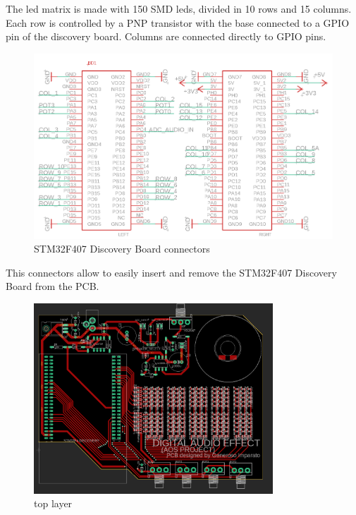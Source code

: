     The led matrix is made with 150 SMD leds, divided in 10 rows and 15 columns.\\
    Each row is controlled by a PNP transistor with the base connected to a GPIO pin of the discovery board. Columns are connected directly to GPIO pins.
    
    \begin{figure}[H]
      \centering
        \includegraphics[width=\textwidth]{img/stm32.png}
        \caption{STM32F407 Discovery Board connectors}
    \end{figure}
    
    This connectors allow to easily insert and remove the STM32F407 Discovery Board from the PCB.

\newpage
{}
\label{sec:Layout}
    
    \begin{figure}[H]
      \centering
        \includegraphics[width=0.8\textwidth]{img/top.png}
        \caption{top layer}
    \end{figure}
    
